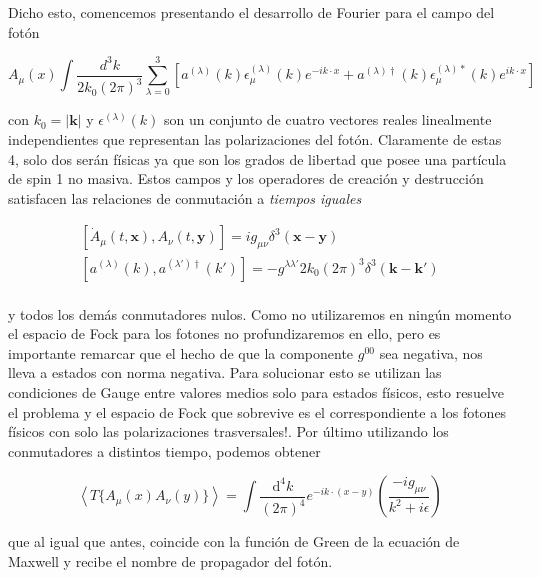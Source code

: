 \documentclass{article}
\numberwithin{equation}{section}
\begin{document}
Dicho esto, comencemos presentando el desarrollo de Fourier para el campo del fotón

\begin{equation}
A_{\mu}(x) \int \frac{d^3k}{2k_0(2\pi)^3} \sum_{\lambda=0}^3 \left[a^{(\lambda)}(k)\epsilon_{\mu}^{(\lambda)}(k)e^{-ik\cdot x} + a^{(\lambda)\dagger}(k)\epsilon_{\mu}^{(\lambda)*}(k)e^{ik\cdot x} \right]
\end{equation}

con $ k_0 = | \mathbf{k} | $ y $ \epsilon^{(\lambda)}(k) $ son un conjunto de cuatro vectores reales linealmente independientes que representan las polarizaciones del fotón. Claramente de estas 4, solo dos serán físicas ya que son los grados de libertad que posee una partícula de spin 1 no masiva. Estos campos y los operadores de creación y destrucción satisfacen las relaciones de conmutación a \textit{tiempos iguales}

\begin{equation}
\begin{aligned}
\left[\dot{A}_{\mu}(t,\mathbf{x}),A_{\nu}(t,\mathbf{y})\right]=ig_{\mu \nu}\delta^3(\mathbf{x} - \mathbf{y})\\
\left[a^{(\lambda)}(k),a^{(\lambda')\dagger}(k')\right]=-g^{\lambda \lambda'}2k_0(2\pi)^3\delta^3(\mathbf{k} - \mathbf{k'})\\
\end{aligned}
\end{equation}

y todos los demás conmutadores nulos. Como no utilizaremos en ningún momento el espacio de Fock para los fotones no profundizaremos en ello, pero es importante remarcar que el hecho de que la componente $ g^{00} $ sea negativa, nos lleva a estados con norma negativa. Para solucionar esto se utilizan las condiciones de Gauge entre valores medios solo para estados físicos, esto resuelve el problema y el espacio de Fock que sobrevive es el correspondiente a los fotones físicos con solo las polarizaciones trasversales!. Por último utilizando los conmutadores a distintos tiempo, podemos obtener

\begin{equation}\label{prop_foton}
\left\langle T\{A_{\mu}(x)A_{\nu}(y)\} \right\rangle =\int\frac{\mathrm{d^4}k}{(2\pi)^{4}}e^{-ik\cdot(x-y)}\left(\frac{-ig_{\mu\nu}}{k^2 +i\epsilon}\right)
\end{equation}

que al igual que antes, coincide con la función de Green de la ecuación de Maxwell y recibe el nombre de propagador del fotón.\\
\end{document}
